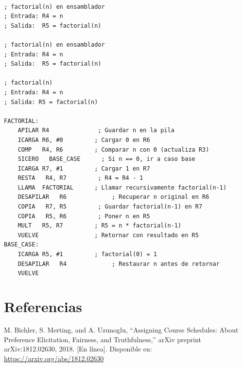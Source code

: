 \documentclass{article}
\begin{document}
\begin{verbatim}

; factorial(n) en ensamblador
; Entrada: R4 = n
; Salida:  R5 = factorial(n)

; factorial(n) en ensamblador
; Entrada: R4 = n
; Salida:  R5 = factorial(n)

; factorial(n)
; Entrada: R4 = n
; Salida: R5 = factorial(n)

FACTORIAL:
    APILAR R4              ; Guardar n en la pila
    ICARGA R6, #0         ; Cargar 0 en R6
    COMP   R4, R6         ; Comparar n con 0 (actualiza R3)
    SICERO   BASE_CASE      ; Si n == 0, ir a caso base
    ICARGA R7, #1         ; Cargar 1 en R7
    RESTA   R4, R7         ; R4 = R4 - 1
    LLAMA  FACTORIAL      ; Llamar recursivamente factorial(n-1)
    DESAPILAR   R6             ; Recuperar n original en R6
    COPIA   R7, R5         ; Guardar factorial(n-1) en R7
    COPIA   R5, R6         ; Poner n en R5
    MULT   R5, R7         ; R5 = n * factorial(n-1)
    VUELVE                ; Retornar con resultado en R5
BASE_CASE:
    ICARGA R5, #1         ; factorial(0) = 1
    DESAPILAR   R4             ; Restaurar n antes de retornar
    VUELVE

\end{verbatim}



\section{Referencias}
\renewcommand{\refname}{}

\begin{thebibliography}{9}

   \label{ref:BPS} M. Bichler, S. Merting, and A. Uzunoglu,
  “Assigning Course Schedules: About Preference Elicitation, Fairness, and Truthfulness,”
  arXiv preprint arXiv:1812.02630, 2018. [En línea]. Disponible en:
  \url{https://arxiv.org/abs/1812.02630}


\end{thebibliography}
\end{document}
